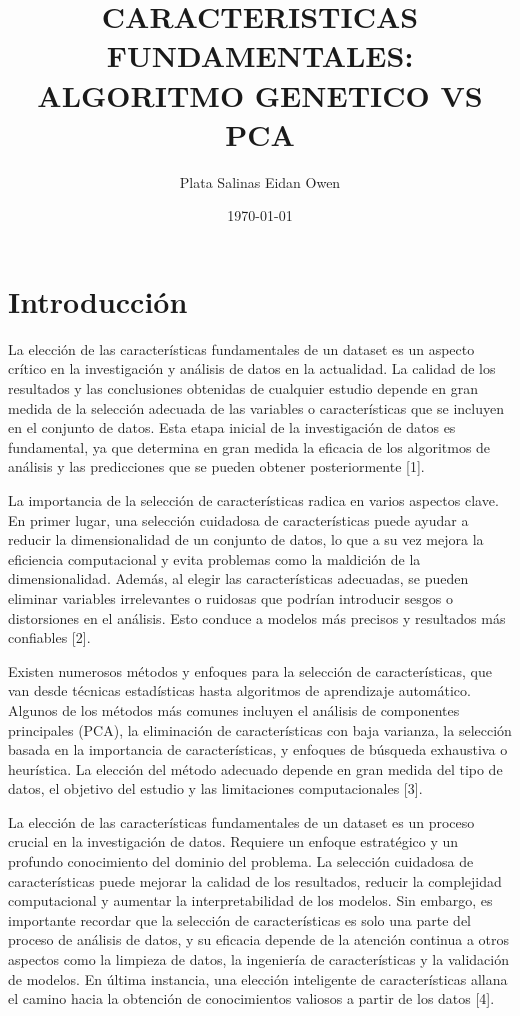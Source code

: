 \documentclass[12pt]{article}
\title{CARACTERISTICAS FUNDAMENTALES: ALGORITMO GENETICO VS PCA}
\author{Plata Salinas Eidan Owen}
\date{\today}
\begin{document}
\maketitle
\pagebreak

\section*{Introducción}
La elección de las características fundamentales de un dataset es un aspecto crítico en la investigación y análisis de datos en la actualidad. La calidad de los resultados y las conclusiones obtenidas de cualquier estudio depende en gran medida de la selección adecuada de las variables o características que se incluyen en el conjunto de datos. Esta etapa inicial de la investigación de datos es fundamental, ya que determina en gran medida la eficacia de los algoritmos de análisis y las predicciones que se pueden obtener posteriormente [1]. \vspace{1cm}

La importancia de la selección de características radica en varios aspectos clave. En primer lugar, una selección cuidadosa de características puede ayudar a reducir la dimensionalidad de un conjunto de datos, lo que a su vez mejora la eficiencia computacional y evita problemas como la maldición de la dimensionalidad. Además, al elegir las características adecuadas, se pueden eliminar variables irrelevantes o ruidosas que podrían introducir sesgos o distorsiones en el análisis. Esto conduce a modelos más precisos y resultados más confiables [2]. \vspace{1cm}

Existen numerosos métodos y enfoques para la selección de características, que van desde técnicas estadísticas hasta algoritmos de aprendizaje automático. Algunos de los métodos más comunes incluyen el análisis de componentes principales (PCA), la eliminación de características con baja varianza, la selección basada en la importancia de características, y enfoques de búsqueda exhaustiva o heurística. La elección del método adecuado depende en gran medida del tipo de datos, el objetivo del estudio y las limitaciones computacionales [3]. \vspace{1cm}

La elección de las características fundamentales de un dataset es un proceso crucial en la investigación de datos. Requiere un enfoque estratégico y un profundo conocimiento del dominio del problema. La selección cuidadosa de características puede mejorar la calidad de los resultados, reducir la complejidad computacional y aumentar la interpretabilidad de los modelos. Sin embargo, es importante recordar que la selección de características es solo una parte del proceso de análisis de datos, y su eficacia depende de la atención continua a otros aspectos como la limpieza de datos, la ingeniería de características y la validación de modelos. En última instancia, una elección inteligente de características allana el camino hacia la obtención de conocimientos valiosos a partir de los datos [4]. \vspace{1cm}
\end{document}

